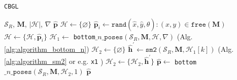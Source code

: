 \begin{figure}
  
  \vspace{1cm}
  \caption{\small }
  \label{fig:h_fig1}
\end{figure}

\begin{figure}[]\centering
  
  \caption{\small }
  \label{fig:cbgl}
\end{figure}

\begin{figure}[]\centering
  
  \caption{\small }
  \label{fig:cbgl}
\end{figure}





\begin{algorithm}
  \caption{\texttt{CBGL}}
  \begin{spacing}{1.2}
  \begin{algorithmic}[1]
    \REQUIRE $\mathcal{S}_R$, $\bm{M}$, $|\mathcal{H}|$, $\nabla$
    \ENSURE $\hat{\bm{p}}$
    \STATE $\mathcal{H} \leftarrow \{\varnothing\}$
      \STATE $\hat{\bm{p}}_i \leftarrow \texttt{rand}(\hat{x},\hat{y},\hat{\theta}): (x,y) \in \texttt{free}(\bm{M})$
      \STATE $\mathcal{H} \leftarrow \{\mathcal{H}, \hat{\bm{p}}_i\}$
    \ENDFOR
    \STATE $\mathcal{H}_1 \leftarrow$ \texttt{bottom}$\_n\_\texttt{poses}(\mathcal{S}_R, \bm{M}, \mathcal{H}, \nabla)$ \hfill {\small (Alg. \ref{alg:algorithm_bottom_n}})
    \STATE $\mathcal{H}_2 \leftarrow \{\varnothing \}$
      \STATE $\hat{\bm{h}}^\prime \leftarrow \texttt{sm2}(\mathcal{S}_R, \bm{M}, \mathcal{H}_1[k])$ \hfill {\small (Alg. \ref{alg:algorithm_sm2} or e.g. \texttt{x1} \cite{FILOTHEOU2023100288}})
      \STATE $\mathcal{H}_2 \leftarrow \{\mathcal{H}_2, \hat{\bm{h}}^\prime\}$
    \ENDFOR
    \STATE $\hat{\bm{p}} \leftarrow$ \texttt{bottom}$\_n\_\texttt{poses}(\mathcal{S}_R, \bm{M}, \mathcal{H}_2, 1)$
    \RETURN $\hat{\bm{p}}$
  \end{algorithmic}
  \end{spacing}
  \label{alg:algorithm_cbgl}
\end{algorithm}


